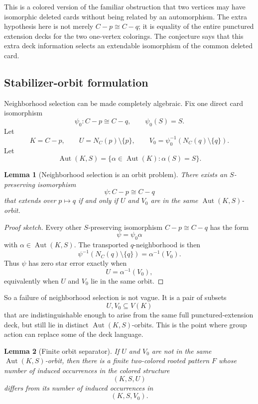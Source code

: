 \documentclass[11pt]{article}
\newtheorem{lemma}{Lemma}
\newcommand{\Aut}{\operatorname{Aut}}
\begin{document}
This is a colored version of the familiar obstruction that two vertices may
have isomorphic deleted cards without being related by an automorphism.  The
extra hypothesis here is not merely \(C-p\cong C-q\); it is equality of the
entire punctured extension decks for the two one-vertex colorings.  The
conjecture says that this extra deck information selects an extendable
isomorphism of the common deleted card.

\subsection{Stabilizer-orbit formulation}

Neighborhood selection can be made completely algebraic.  Fix one direct
card isomorphism
\[
  \psi_0:C-p\cong C-q,\qquad \psi_0(S)=S.
\]
Let
\[
  K=C-p,
  \qquad
  U=N_C(p)\setminus\{p\},
  \qquad
  V_0=\psi_0^{-1}(N_C(q)\setminus\{q\}).
\]
Let
\[
  \Aut(K,S)=\{\alpha\in\Aut(K):\alpha(S)=S\}.
\]

\begin{lemma}[Neighborhood selection is an orbit problem]
There exists an \(S\)-preserving isomorphism
\[
  \psi:C-p\cong C-q
\]
that extends over \(p\mapsto q\) if and only if \(U\) and \(V_0\) are in the
same \(\Aut(K,S)\)-orbit.
\end{lemma}

\begin{proof}[Proof sketch]
Every other \(S\)-preserving isomorphism \(C-p\cong C-q\) has the form
\[
  \psi=\psi_0\alpha
\]
with \(\alpha\in\Aut(K,S)\).  The transported \(q\)-neighborhood is then
\[
  \psi^{-1}(N_C(q)\setminus\{q\})
  =
  \alpha^{-1}(V_0).
\]
Thus \(\psi\) has zero star error exactly when
\[
  U=\alpha^{-1}(V_0),
\]
equivalently when \(U\) and \(V_0\) lie in the same orbit.
\end{proof}

So a failure of neighborhood selection is not vague.  It is a pair of subsets
\[
  U,V_0\subseteq V(K)
\]
that are indistinguishable enough to arise from the same full
punctured-extension deck, but still lie in distinct \(\Aut(K,S)\)-orbits.
This is the point where group action can replace some of the deck language.

\begin{lemma}[Finite orbit separator]
If \(U\) and \(V_0\) are not in the same \(\Aut(K,S)\)-orbit, then there is a
finite two-colored rooted pattern \(F\) whose number of induced occurrences
in the colored structure
\[
  (K,S,U)
\]
differs from its number of induced occurrences in
\[
  (K,S,V_0).
\]
\end{lemma}
\end{document}
